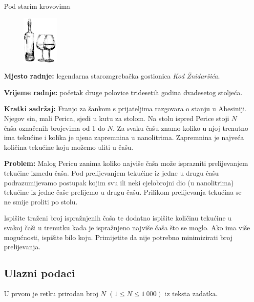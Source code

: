 \begin{statement}[
  problempoints=50,
  timelimit=1 sekunda,
  memorylimit=512 MiB,
]{Pod starim krovovima}

\setlength\intextsep{-0.1cm}
\begin{figure}
\centering
\includegraphics[width=0.16\textwidth]{img/psk.png}
\end{figure}

\textbf{Mjesto radnje:} legendarna starozagrebačka gostionica \textit{Kod
Žnidaršića}.

\textbf{Vrijeme radnje:} početak druge polovice tridesetih godina dvadesetog
stoljeća.

\textbf{Kratki sadržaj:} Franjo za šankom s prijateljima razgovara o stanju u
Abesiniji. Njegov sin, mali Perica, sjedi u kutu za stolom. Na stolu ispred
Perice stoji $N$ čaša označenih brojevima od $1$ do $N$. Za svaku čašu znamo
koliko u njoj trenutno ima tekućine i kolika je njena zapremnina u nanolitrima.
Zapremnina je najveća količina tekućine koju možemo uliti u čašu.

\textbf{Problem:} Malog Pericu zanima koliko najviše čaša može isprazniti
prelijevanjem tekućine između čaša. Pod prelijevanjem tekućine iz jedne u
drugu čašu podrazumijevamo postupak kojim svu ili neki cjelobrojni dio (u
nanolitrima) tekućine iz jedne čaše prelijemo u drugu čašu. Prilikom
prelijevanja tekućina se ne smije proliti po stolu.

Ispišite traženi broj ispražnjenih čaša te dodatno ispišite količinu tekućine u
svakoj čaši u trenutku kada je ispražnjeno najviše čaša što se moglo.  Ako
ima više mogućnosti, ispišite bilo koju. Primijetite da nije potrebno
minimizirati broj prelijevanja.

\subsection*{Ulazni podaci}
U prvom je retku prirodan broj $N$ $(1 \le N \le 1\ 000)$ iz teksta zadatka.


\end{statement}

